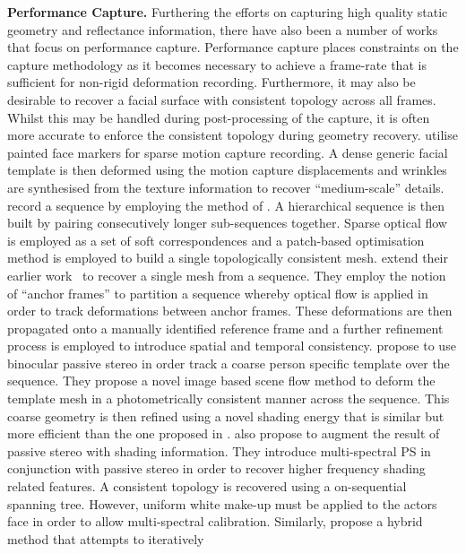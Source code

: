 \textbf{Performance Capture.} Furthering the efforts on capturing high
quality static geometry and reflectance information, there have also been
a number of works that focus on performance capture. Performance capture places
constraints on the capture methodology as it becomes necessary to achieve
a frame-rate that is sufficient for non-rigid deformation recording.
Furthermore, it may also be desirable to recover a facial surface with
consistent topology across all frames. Whilst this may be handled during
post-processing of the capture, it is often more accurate to enforce
the consistent topology during geometry recovery. \citet{bickel2007multi}
utilise painted face markers for sparse motion capture recording. A dense
generic facial template is then deformed using the motion capture displacements
and wrinkles are synthesised from the texture information to recover
``medium-scale'' details. \citet{popa2010globally} record a sequence by
employing the method of \citet{bradley2010high}. A hierarchical sequence
is then built by pairing consecutively longer sub-sequences together. Sparse
optical flow is employed as a set of soft correspondences and a patch-based
optimisation method is employed to build a single topologically consistent
mesh. \citet{Beeler:2011ey} extend their earlier work~\cite{Beeler:2010dg}
to recover a single mesh from a sequence. They employ the notion
of ``anchor frames'' to partition a sequence whereby optical flow is applied
in order to track deformations between anchor frames. These deformations
are then propagated onto a manually identified reference frame and a further
refinement process is employed to introduce spatial and temporal consistency.
\citet{valgaerts2012lightweight} propose to use binocular passive stereo
in order track a coarse person specific template over the sequence. They
propose a novel image based scene flow method to deform the template
mesh in a photometrically consistent manner across the sequence. This coarse
geometry is then refined using a novel shading energy that is similar
but more efficient than the one proposed in \citet{wu2011high}.
\citet{klaudiny2012high} also propose to augment the result of passive
stereo with shading information. They introduce multi-spectral PS in
conjunction with passive stereo in order to recover higher frequency
shading related features. A consistent topology is recovered using
a on-sequential spanning tree. However, uniform white make-up must be applied
to the actors face in order to allow multi-spectral calibration. Similarly,
\citet{Gotardo:2015vo} propose a hybrid method that attempts to iteratively
